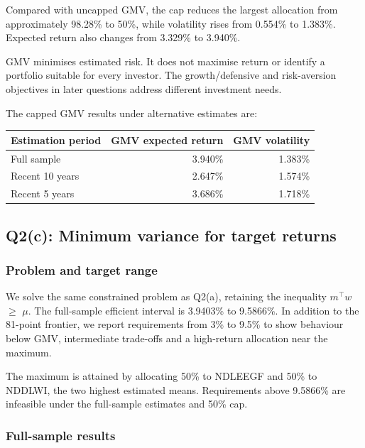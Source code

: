\documentclass[
  10pt,
  a4paper,
]{article}
\begin{document}
Compared with uncapped GMV, the cap reduces the largest allocation from
approximately 98.28\% to 50\%, while volatility rises from 0.554\% to
1.383\%. Expected return also changes from 3.329\% to 3.940\%.

GMV minimises estimated risk. It does not maximise return or identify a
portfolio suitable for every investor. The growth/defensive and
risk-aversion objectives in later questions address different investment
needs.

The capped GMV results under alternative estimates are:

\begin{longtable}[]{@{}lrr@{}}
\toprule\noalign{}
Estimation period & GMV expected return & GMV volatility \\
\midrule\noalign{}
\endhead
\bottomrule\noalign{}
\endlastfoot
Full sample & 3.940\% & 1.383\% \\
Recent 10 years & 2.647\% & 1.574\% \\
Recent 5 years & 3.686\% & 1.718\% \\
\end{longtable}

\newpage

\hypertarget{q2c-minimum-variance-for-target-returns}{%
\subsection{Q2(c): Minimum variance for target
returns}\label{q2c-minimum-variance-for-target-returns}}

\hypertarget{problem-and-target-range}{%
\subsubsection{Problem and target
range}\label{problem-and-target-range}}

We solve the same constrained problem as Q2(a), retaining the inequality
\(m^\top w\) \(\geq\) \(\mu\). The full-sample efficient interval is
3.9403\% to 9.5866\%. In addition to the 81-point frontier, we report
requirements from 3\% to 9.5\% to show behaviour below GMV, intermediate
trade-offs and a high-return allocation near the maximum.

The maximum is attained by allocating 50\% to NDLEEGF and 50\% to
NDDLWI, the two highest estimated means. Requirements above 9.5866\% are
infeasible under the full-sample estimates and 50\% cap.

\hypertarget{full-sample-results}{%
\subsubsection{Full-sample results}\label{full-sample-results}}
\end{document}
